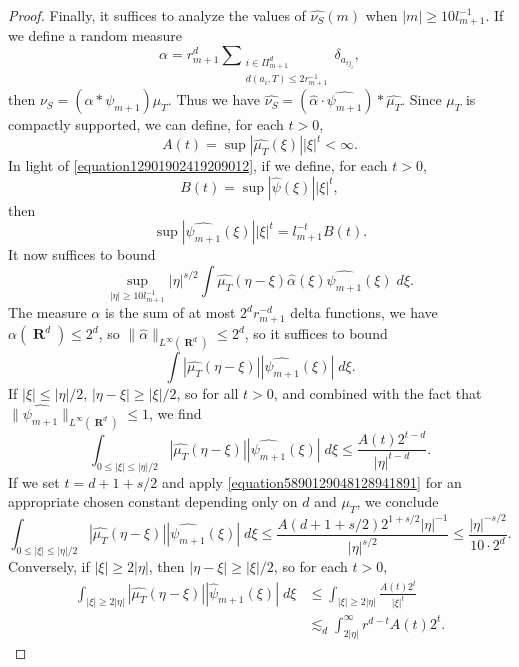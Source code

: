 \documentclass[12pt,reqno]{amsart}
\DeclareMathOperator{\RR}{\mathbf{R}}
\begin{document}
\begin{proof}
    Finally, it suffices to analyze the values of $\widehat{\nu_S}(m)$ when $|m| \geq 10 l_{m+1}^{-1}$. If we define a random measure
    \[ \alpha = r_{m+1}^d \sum\nolimits_{\substack{i \in \Pi_{m+1}^d\\d(a_i,T) \leq 2 r_{m+1}^{-1}}} \delta_{a_{ij_i}}, \]
    then $\nu_S = (\alpha * \psi_{m+1}) \mu_T$.
    Thus we have $\widehat{\nu_S} = (\widehat{\alpha} \cdot \widehat{\psi_{m+1}}) * \widehat{\mu_T}$. Since $\mu_T$ is compactly supported, we can define, for each $t > 0$,
    \[ A(t) = \sup |\widehat{\mu_T}(\xi)| |\xi|^t < \infty. \]
    In light of \eqref{equation12901902419209012}, if we define, for each $t > 0$,
    \[ B(t) = \sup |\widehat{\psi}(\xi)| |\xi|^t, \]
    then
    \[ \sup |\widehat{\psi_{m+1}}(\xi)| |\xi|^t = l_{m+1}^{-t} B(t). \]
    It now suffices to bound
    \[ \sup_{|\eta| \geq 10 l_{m+1}^{-1}} |\eta|^{s/2} \int \widehat{\mu_T}(\eta - \xi) \widehat{\alpha}(\xi) \widehat{\psi_{m+1}}(\xi)\; d\xi. \]
    The measure $\alpha$ is the sum of at most $2^d r_{m+1}^{-d}$ delta functions, we have $\alpha(\RR^d) \leq 2^d$, so $\| \widehat{\alpha} \|_{L^\infty(\RR^d)} \leq 2^d$, so it suffices to bound
    \[ \int |\widehat{\mu_T}(\eta - \xi)| |\widehat{\psi_{m+1}}(\xi)|\; d\xi. \]
    If $|\xi| \leq |\eta|/2$, $|\eta - \xi| \geq |\xi|/2$, so for all $t > 0$, and combined with the fact that $\| \widehat{\psi_{m+1}} \|_{L^\infty(\RR^d)} \leq 1$, we find
    \[ \int_{0 \leq |\xi| \leq |\eta|/2} |\widehat{\mu_T}(\eta - \xi)| |\widehat{\psi_{m+1}}(\xi)|\; d\xi \leq \frac{A(t) 2^{t-d}}{|\eta|^{t-d}}. \]
    If we set $t = d + 1 + s/2$ and apply \eqref{equation5890129048128941891} for an appropriate chosen constant depending only on $d$ and $\mu_T$, we conclude
    \[ \int_{0 \leq |\xi| \leq |\eta|/2} |\widehat{\mu_T}(\eta - \xi)| |\widehat{\psi_{m+1}}(\xi)|\; d\xi \leq \frac{A(d + 1 + s/2) 2^{1 + s/2} |\eta|^{-1}}{|\eta|^{s/2}} \leq \frac{|\eta|^{-s/2}}{10 \cdot 2^d}. \]
    Conversely, if $|\xi| \geq 2|\eta|$, then $|\eta - \xi| \geq |\xi|/2$, so for each $t > 0$,
    \begin{align*}
        \int_{|\xi| \geq 2|\eta|} |\widehat{\mu_T}(\eta - \xi)| |\widehat{\psi}_{m+1}(\xi)|\; d\xi &\leq \int_{|\xi| \geq 2|\eta|} \frac{A(t) 2^t}{|\xi|^t}\\
        &\lesssim_d \int_{2|\eta|}^\infty r^{d - t} A(t) 2^t.

\end{align*}
\end{proof}
\end{document}
